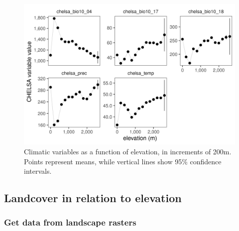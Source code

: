 \documentclass[]{article}
\begin{document}
\begin{figure}
\centering
\includegraphics{"figs/fig_climate_elev.png"}
\caption{Climatic variables as a function of elevation, in increments of 200m. Points represent means, while vertical lines show 95\% confidence intervals.}
\end{figure}

\hypertarget{landcover-in-relation-to-elevation}{%
\subsection{Landcover in relation to elevation}\label{landcover-in-relation-to-elevation}}

\hypertarget{get-data-from-landscape-rasters}{%
\subsubsection{Get data from landscape rasters}\label{get-data-from-landscape-rasters}}
\end{document}

